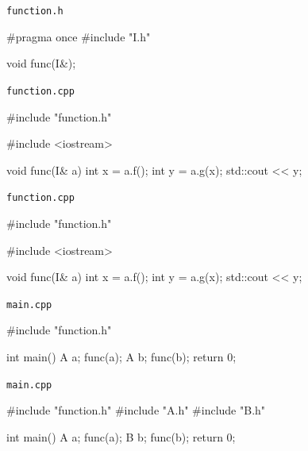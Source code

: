 \newsavebox\funchb
\begin{lrbox}{\funchb}%
\begin{minipage}[\baselineskip]{\codewidth}
\texttt{function.h}
\begin{cppcode}[numbers = none]
#pragma once
#include "I.h"


void func(I&);

\end{cppcode}
\end{minipage}%
\end{lrbox}

\newsavebox\funccppb
\begin{lrbox}{\funccppb}%
\begin{minipage}[\baselineskip]{\codewidth}
\texttt{function.cpp}
\begin{cppcode}[numbers = none]
#include "function.h"

#include <iostream>

void func(I& a) {
  int x = a.f();
  int y = a.g(x);
  std::cout << y;
}
\end{cppcode}
\end{minipage}%
\end{lrbox}

\newsavebox\funccppc
\begin{lrbox}{\funccppc}%
\begin{minipage}[\baselineskip]{\codewidth}
\texttt{function.cpp}
\begin{cppcode}[numbers = none]
#include "function.h"

#include <iostream>


void func(I& a) {
  int x = a.f();
  int y = a.g(x);
  std::cout << y;
}

\end{cppcode}
\end{minipage}%
\end{lrbox}

\newsavebox\main
\begin{lrbox}{\main}%
\begin{minipage}[\baselineskip]{\codewidth}
\texttt{main.cpp}
\begin{cppcode}[numbers = none]
#include "function.h"

int main() {
  A a;
  func(a);
  A b;
  func(b);
  return 0;
}
\end{cppcode}
\end{minipage}%
\end{lrbox}

\newsavebox\maina
\begin{lrbox}{\maina}%
\begin{minipage}[\baselineskip]{\codewidth}
\texttt{main.cpp}
\begin{cppcode}[numbers = none]
#include "function.h"
#include "A.h"
#include "B.h"

int main() {
  A a;
  func(a);
  B b;
  func(b);
  return 0;
}
\end{cppcode}
\end{minipage}%
\end{lrbox}


